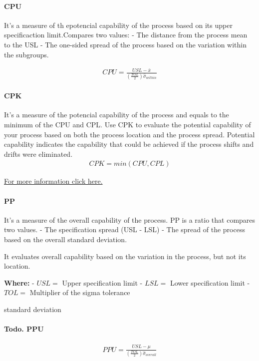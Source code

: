 \documentclass[11pt]{article}
\begin{document}
\hypertarget{cpu}{%
\paragraph{CPU}\label{cpu}}

It's a measure of th epotencial capability of the process based on its
upper specificaction limit.Compares two values: - The distance from the
process mean to the USL - The one-sided spread of the process based on
the variation within the subgroups.

\begin{gather}
  CPU = \frac{USL - \bar{x} }{(\frac{TOL}{2})\hat{\sigma}_{within}}
\end{gather}

\hypertarget{cpk}{%
\paragraph{CPK}\label{cpk}}

It's a measure of the potencial capability of the process and equals to
the minimum of the CPU and CPL. Use CPK to evaluate the potential
capability of your process based on both the process location and the
process spread. Potential capability indicates the capability that could
be achieved if the process shifts and drifts were eliminated.
\begin{gather}
  CPK = min(CPU, CPL)
\end{gather}

\href{https://www.six-sigma-material.com/Cpk.html}{For more information click here.}

\hypertarget{pp}{%
\paragraph{PP}\label{pp}}

It's a measure of the overall capability of the process. PP is a ratio
that compares two values. - The specification spread (USL - LSL) - The
spread of the process based on the overall standard deviation.

It evaluates overall capability based on the variation in the process,
but not its location.



\textbf{Where:} - \(USL =\) Upper specification limit - \(LSL =\) Lower
specification limit - \(TOL =\) Multiplier of the sigma tolerance

standard deviation

\hypertarget{todo.-ppu}{%
\paragraph{Todo. PPU}\label{todo.-ppu}}
\begin{gather}
  PPU = \frac{USL - \mu }{(\frac{TOL}{2})\hat{\sigma}_{overall}}
\end{gather}
\end{document}
